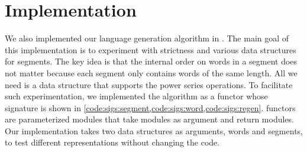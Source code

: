 \section{\ocaml Implementation}
\label{sec:ocaml}

\lstset{language=[Objective]Caml}

We also implemented our
language generation algorithm in \ocaml.
The main goal of this implementation is to experiment with strictness
and various data structures for segments. 
The key idea is that the internal order on words in a segment does not matter
because each segment only contains words of the same length.
All we need is a data structure that supports the power series
operations.
%
To facilitate such experimentation, we implemented the
algorithm as a functor whose signature is shown in
\cref{code:sigs:segment,code:sigs:word,code:sigs:regen}.
\ocaml{} functors are parameterized modules that take modules
as argument and return modules. Our implementation
takes two data structures as arguments, words and segments,
to test different representations without changing
the code.

